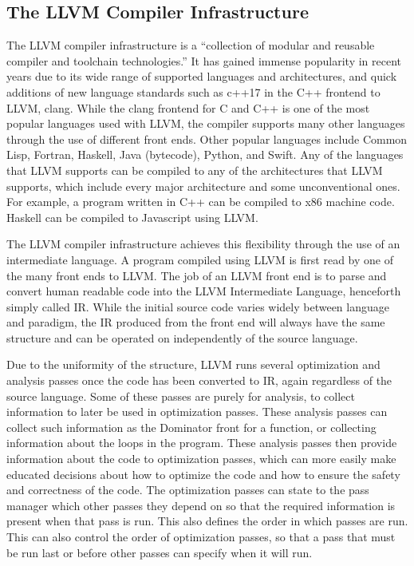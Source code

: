 \documentclass[conference]{IEEEtran}
\begin{document}
\subsection{The LLVM Compiler Infrastructure}
The LLVM compiler infrastructure is a ``collection of modular and
reusable compiler and toolchain technologies.'' \cite{llvm-home} It
has gained immense popularity in recent years due to its wide range of
supported languages and architectures, and quick additions of new
language standards such as c++17 in the C++ frontend to LLVM,
clang. While the clang frontend for C and C++ is one of the most
popular languages used with LLVM, the compiler supports many other
languages through the use of different front ends. Other popular
languages include Common Lisp, Fortran, Haskell, Java (bytecode),
Python, and Swift. Any of the languages that LLVM supports can be
compiled to any of the architectures that LLVM supports, which include
every major architecture and some unconventional ones. For example, a
program written in C++ can be compiled to x86 machine code. Haskell
can be compiled to Javascript using LLVM.

The LLVM compiler infrastructure achieves this flexibility through the
use of an intermediate language. A program compiled using LLVM is
first read by one of the many front ends to LLVM. The job of an LLVM
front end is to parse and convert human readable code into the LLVM
Intermediate Language, henceforth simply called IR. While the initial
source code varies widely between language and paradigm, the IR
produced from the front end will always have the same structure and
can be operated on independently of the source language.

Due to the uniformity of the structure, LLVM runs several optimization
and analysis passes once the code has been converted to IR, again
regardless of the source language. Some of these passes are purely for
analysis, to collect information to later be used in optimization
passes. These analysis passes can collect such information as the
Dominator front for a function, or collecting information about the
loops in the program. These analysis passes then provide information
about the code to optimization passes, which can more easily make
educated decisions about how to optimize the code and how to ensure
the safety and correctness of the code. The optimization passes can
state to the pass manager which other passes they depend on so that
the required information is present when that pass is run. This also
defines the order in which passes are run. This can also control the
order of optimization passes, so that a pass that must be run last or
before other passes can specify when it will run.
\end{document}
